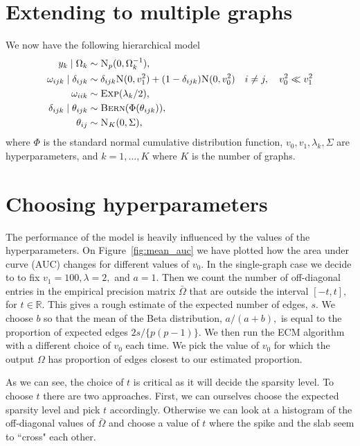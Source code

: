 \documentclass[a4paper, 11pt, oneside]{report}
\newcommand{\R}{\mathbb{R}}
\newcommand{\1}{\mathds{1}}
\newcommand{\Np}{\textsc{N}_p}
\newcommand{\Nor}{\textsc{N}}
\newcommand{\Bern}{\textsc{Bern}}
\newcommand{\Exp}{\textsc{Exp}}
\begin{document}
\chapter{Extending to multiple graphs}
We now have the following hierarchical model
\begin{align*}
	y_k \mid \Omega_k              & \sim \Np(0, \Omega_k^{-1}),                                                                                \\
	\omega_{ijk} \mid \delta_{ijk} & \sim \delta_{ijk} \Nor(0, v_1^2) + (1 - \delta_{ijk}) \Nor(0, v_0^2) \quad i \neq j, \quad v_0^2 \ll v_1^2 \\
	\omega_{iik}                   & \sim \Exp(\lambda_k/2),                                                                                    \\
	\delta_{ijk} \mid \theta_{ijk} & \sim \Bern(\Phi(\theta_{ijk})),                                                                            \\
	\theta_{ij}                    & \sim \textsc{N}_K(0, \Sigma),
\end{align*}
where $\Phi$ is the standard normal cumulative distribution function, $v_0,
	v_1, \lambda_k, \Sigma$ are hyperparameters, and $k=1,\dots,K$ where $K$ is the
number of graphs.

\chapter{Choosing hyperparameters}
The performance of the model is heavily influenced by the values of the
hyperparameters. On Figure~\ref{fig:mean_auc} we have plotted how the area
under curve (AUC) changes for different values of $v_0.$ In the single-graph
case we decide to to fix $v_1 = 100,
	\lambda = 2,$ and $a = 1$. Then we count the number of off-diagonal entries in
the empirical precision matrix $\bar \Omega$ that are outside the interval
$[-t, t],$ for $t \in \R$. This gives a rough estimate of the expected number
of edges, $s$. We choose $b$ so that the mean of the Beta distribution,
$a/(a+b),$ is equal to the proportion of expected edges $2s/\{p(p-1)\}.$ We then
run the ECM algorithm with a different choice of $v_0$ each time. We pick the
value of $v_0$ for which the output $\Omega$ has proportion of edges closest to
our estimated proportion.

As we can see, the choice of $t$ is critical as it will decide the sparsity level.
To choose $t$ there are two approaches. First, we can ourselves choose the
expected sparsity level and pick $t$ accordingly. Otherwise we can look at a
histogram of the off-diagonal values of $\bar \Omega$ and choose a value of $t$
where the spike and the slab seem to ``cross" each other.
\end{document}
